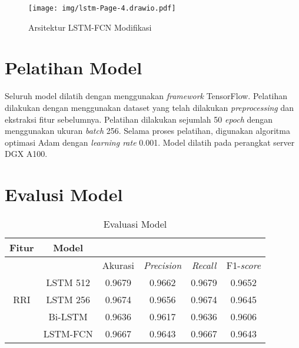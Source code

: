 \begin{figure}[H]
  \centering
  \texttt{[image: img/lstm-Page-4.drawio.pdf]}
  \caption{Arsitektur LSTM-FCN Modifikasi}
  \label{fig:arslstmfcn}
\end{figure}

\section{Pelatihan Model}

Seluruh model dilatih dengan menggunakan \textit{framework} TensorFlow. 
Pelatihan dilakukan dengan menggunakan dataset yang telah dilakukan \textit{preprocessing} dan ekstraksi fitur sebelumnya.
Pelatihan dilakukan sejumlah 50 \textit{epoch} dengan menggunakan ukuran \textit{batch} 256.
Selama proses pelatihan, digunakan algoritma optimasi Adam dengan \textit{learning rate} 0.001.
Model dilatih pada perangkat server DGX A100.

\section{Evalusi Model}

\begin{table}[ht]
\caption{Evaluasi Model}
\label{hasilLSTM}
\begin{center}
\begin{tabular}{cccccc}
\hline
\multicolumn{1}{c}{Fitur} 
 & \multicolumn{1}{c}{Model}
 & \\
\hline
 & & Akurasi & \emph{Precision} & \emph{Recall} & F1-\emph{score} \\
\hline
\multirow{3}{4em}{RRI} & LSTM 512 & 0.9679 & 0.9662  & 0.9679 &  0.9652 \tabularnewline
& LSTM 256 & 0.9674 & 0.9656 &  0.9674 &  0.9645 \tabularnewline
& Bi-LSTM & 0.9636 & 0.9617  & 0.9636 &  0.9606 \tabularnewline
& LSTM-FCN & 0.9667 & 0.9643 &  0.9667  & 0.9643 \tabularnewline
\hline
\end{tabular}
\end{center}
\end{table}
